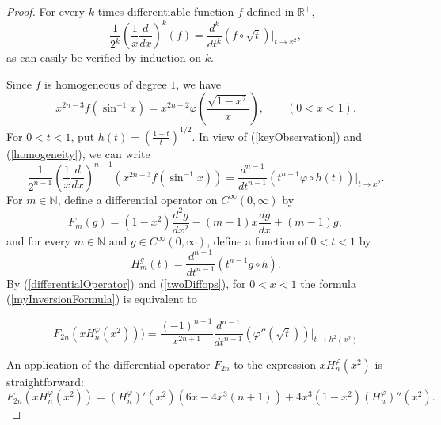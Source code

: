 \documentclass[10pt,a4paper]{amsart}
\newcommand\ar{\mathbb{R}}
\newcommand\inverseRadonPart[2]{\left(\frac{1}{{#1}}\frac{d}{d{#1}}\right)^{#2}}
\newcommand\smallcirc{\scriptstyle\circ}
\begin{document}
\begin{proof} 

For every $k$-times differentiable function $f$ defined in $\ar^+$,
\begin{equation}\label{keyObservation}
\frac{1}{2^k}\left(\frac{1}{x}\frac{d}{dx}\right)^k(f)=\frac{d^k}{dt^k}(f{\smallcirc}\sqrt{t})\Big|_{t\to x^2},
\end{equation}
as can easily be verified by induction on $k$.

\medskip

Since $f$ is homogeneous of degree $1$,  we have 
\begin{equation}\label{homogeneity}
 x^{2n-3}f(\sin^{-1}x)=x^{2n-2}\varphi(\frac{\sqrt{1-x^2}}{x}),\qquad (0<x <1).
 \end{equation}
For $0<t<1$, put  $h(t)=(\frac{1-t}{t})^{1/2}$. In view of (\ref{keyObservation}) and (\ref{homogeneity}), we can write
\begin{equation}\label{twoDiffops}
\frac{1}{2^{n-1}}\inverseRadonPart{x}{n-1}(x^{2n-3}f(\sin^{-1} x)) = \frac{d^{n-1}}{dt^{n-1}}(t^{n-1}\varphi{\smallcirc} h(t))\Big|_{t\to x^2}.
\end{equation}
For $m\in\mathbb{N}$, define a differential operator on $C^{\infty}(0,\infty)$ by
\[ F_m(g)=(1-x^2)\frac{d^2g}{dx^2}-(m-1)x\frac{dg}{dx}+(m-1)g,\]
and for every $m\in\mathbb{N}$ and $g\in C^{\infty}(0,\infty)$, define a function of $0<t<1$ by
\[ H_m^g(t)=\frac{d^{n-1}}{dt^{n-1}}(t^{n-1}g{\smallcirc} h). \]
By (\ref{differentialOperator}) and (\ref{twoDiffops}),  for $0<x<1$ the formula (\ref{myInversionFormula})  is 
equivalent to 

\begin{equation}\label{eq1}F_{2n}(x H_n^{\varphi}(x^2)))=
\frac{(-1)^{n-1}}{x^{2n+1}}
\frac{d^{n-1}}{dt^{n-1}}
(\varphi''(\sqrt{t}))\Big|_{t\to h^2(x^2)}
\end{equation}

\medskip

An application of the differential operator $F_{2n}$ to the expression $xH_n^{\varphi}(x^2)$ is straightforward:
\begin{equation}\label{eq2}
F_{2n}(xH_n^\varphi(x^2))=(H_n^\varphi)'(x^2)(6x-4x^3(n+1))+4x^3(1-x^2)(H_n^\varphi)''(x^2).
\end{equation}


\end{proof}
\end{document}
